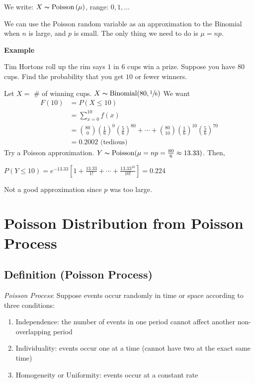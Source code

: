 We write: $ X \thicksim \operatorname{Poisson}\left(\mu\right) $, range: $ 0,1,\ldots $

We can use the Poisson random variable as an approximation to the Binomial
when $ n $ is large, and $ p $ is small. The only thing we need to do
is $ \mu=np $.

\textbf{Example}

Tim Hortons roll up the rim says $ 1 $ in $ 6 $ cups win a prize. Suppose
you have $ 80 $ cups. Find the probability that you get $ 10 $ or fewer
winners.

Let $ X= $ \# of winning cups. $ X \thicksim \operatorname{Binomial}(80,\sfrac{1}{6}) $
We want
\begin{align*}
    F(10) & =P(X\le 10)                                                                   \\
          & =\sum\limits_{x=0}^{10} f(x)                                                  \\
          & =\binom{80}{0}\left(\frac{1}{6}\right)^0\left(\frac{5}{6}\right)^{80}+\cdots+
    \binom{80}{10}\left(\frac{1}{6}\right)^{10}\left(\frac{5}{6}\right)^{70}              \\
          & =0.2002 \text{ (tedious) }
\end{align*}
Try a Poisson approximation.
$ Y \thicksim \operatorname{Poisson}(\mu=np=\frac{80}{6}\approx 13.33) $. Then,

$ P(Y\le 10)=e^{-13.33}\left[1+\frac{13.33}{1!}+\cdots+\frac{13.33^{10}}{10!}\right]=0.224 $

Not a good approximation since $ p $ was too large.

\section{Poisson Distribution from Poisson Process}

\begin{defbox}
    \subsection{Definition (Poisson Process)}
    \emph{Poisson Process}:
    Suppose events occur randomly in time or space according to three conditions:
    \begin{enumerate}[label=(\arabic*)]
        \item Independence: the number of events in one period cannot affect another non-overlapping period
        \item Individuality: events occur one at a time (cannot have two at the exact same time)
        \item Homogeneity or Uniformity: events occur at a constant rate
    \end{enumerate}
\end{defbox}
